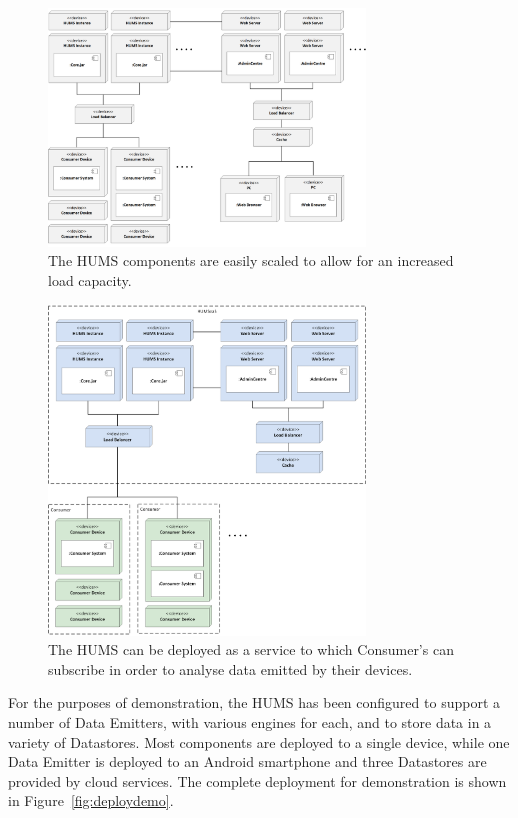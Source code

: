 \documentclass[10pt,a4paper]{article}
\begin{document}
\begin{figure}[htp]
  \centering
  \includegraphics[width=0.75\textwidth]{images/Scaled.png}
  \caption{The HUMS components are easily scaled to allow for an increased load capacity.}
  \label{fig:deployscaled}
\end{figure}

\begin{figure}[htp]
  \centering
  \includegraphics[width=0.75\textwidth]{images/HUMSaaS.png}
  \caption{The HUMS can be deployed as a service to which Consumer's can subscribe in order to analyse data emitted by their devices.}
  \label{fig:deployhumsaas}
\end{figure}

For the purposes of demonstration, the HUMS has been configured to support a number of Data Emitters, with various engines for each, and to store data in a variety of Datastores. Most components are deployed to a single device, while one Data Emitter is deployed to an Android smartphone and three Datastores are provided by cloud services. The complete deployment for demonstration is shown in Figure~\ref{fig:deploydemo}.
\end{document}
